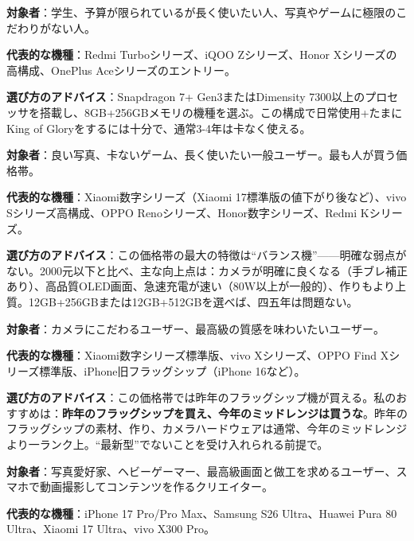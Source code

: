 
\textbf{対象者}：学生、予算が限られているが長く使いたい人、写真やゲームに極限のこだわりがない人。

\textbf{代表的な機種}：Redmi Turboシリーズ、iQOO Zシリーズ、Honor Xシリーズの高構成、OnePlus Aceシリーズのエントリー。

\textbf{選び方のアドバイス}：Snapdragon 7+ Gen3またはDimensity 7300以上のプロセッサを搭載し、8GB+256GBメモリの機種を選ぶ。この構成で日常使用+たまにKing of Gloryをするには十分で、通常3-4年は卡なく使える。


\textbf{対象者}：良い写真、卡ないゲーム、長く使いたい一般ユーザー。最も人が買う価格帯。

\textbf{代表的な機種}：Xiaomi数字シリーズ（Xiaomi 17標準版の値下がり後など）、vivo Sシリーズ高構成、OPPO Renoシリーズ、Honor数字シリーズ、Redmi Kシリーズ。

\textbf{選び方のアドバイス}：この価格帯の最大の特徴は“バランス機”——明確な弱点がない。2000元以下と比べ、主な向上点は：カメラが明確に良くなる（手ブレ補正あり）、高品質OLED画面、急速充電が速い（80W以上が一般的）、作りもより上質。12GB+256GBまたは12GB+512GBを選べば、四五年は問題ない。


\textbf{対象者}：カメラにこだわるユーザー、最高級の質感を味わいたいユーザー。

\textbf{代表的な機種}：Xiaomi数字シリーズ標準版、vivo Xシリーズ、OPPO Find Xシリーズ標準版、iPhone旧フラッグシップ（iPhone 16など）。

\textbf{選び方のアドバイス}：この価格帯では昨年のフラッグシップ機が買える。私のおすすめは：\textbf{昨年のフラッグシップを買え、今年のミッドレンジは買うな}。昨年のフラッグシップの素材、作り、カメラハードウェアは通常、今年のミッドレンジより一ランク上。“最新型”でないことを受け入れられる前提で。


\textbf{対象者}：写真愛好家、ヘビーゲーマー、最高級画面と做工を求めるユーザー、スマホで動画撮影してコンテンツを作るクリエイター。

\textbf{代表的な機種}：iPhone 17 Pro/Pro Max、Samsung S26 Ultra、Huawei Pura 80 Ultra、Xiaomi 17 Ultra、vivo X300 Pro。

